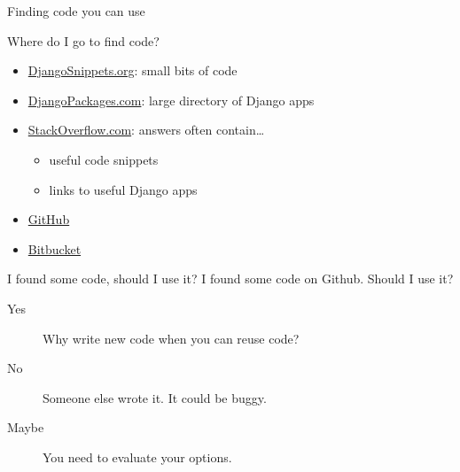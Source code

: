 \documentclass[xcolor=dvipsnames]{beamer}
\begin{document}
\begin{section}{Finding code you can use}

  \begin{frame}{Where do I go to find code?}
    \begin{itemize}
      \item \href{http://djangosnippets.org/}{DjangoSnippets.org}: small bits of code
      \item \href{https://www.djangopackages.com/}{DjangoPackages.com}: large directory of Django apps
      \item \href{http://stackoverflow.com/}{StackOverflow.com}: answers often contain\ldots
      \begin{itemize}
        \item useful code snippets
        \item links to useful Django apps
      \end{itemize}
    \item \href{https://github.com/}{GitHub}
    \item \href{https://bitbucket.org/}{Bitbucket}
    \end{itemize}
  \end{frame}

  \begin{frame}{I found some code, should I use it?}
    I found some code on Github.  Should I use it?

    \begin{description}
      \item[Yes] Why write new code when you can reuse code?
      \item[No] Someone else wrote it.  It could be buggy.
      \item[Maybe] You need to evaluate your options.
    \end{description}
  \end{frame}

\end{section}
\end{document}
